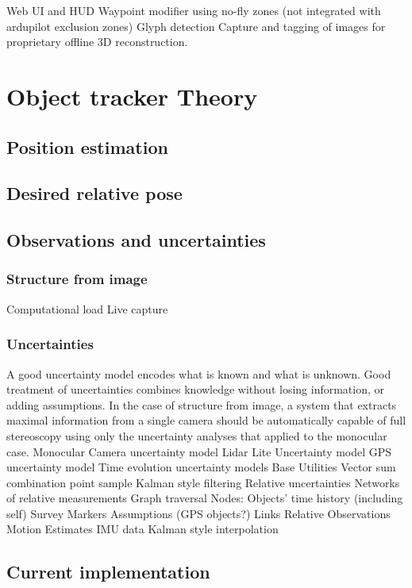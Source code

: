 \documentclass[a4paper, 11pt, titlepage]{article}
\begin{document}
		Web UI and HUD
		Waypoint modifier using no-fly zones (not integrated with ardupilot exclusion zones)
		Glyph detection
		Capture and tagging of images for proprietary offline 3D reconstruction.

\section{Object tracker Theory}
	\subsection{Position estimation}

	\subsection{Desired relative pose}

	\subsection{Observations and uncertainties}
		\subsubsection{Structure from image}
			Computational load
			Live capture
		\subsubsection{Uncertainties}
			A good uncertainty model encodes what is known and what is unknown.
			Good treatment of uncertainties combines knowledge without losing information, or adding assumptions.
			In the case of structure from image, a system that extracts maximal information from a single camera should be automatically capable of full stereoscopy using only the uncertainty analyses that applied to the monocular case.
				Monocular Camera uncertainty model
				Lidar Lite Uncertainty model
				GPS uncertainty model
				Time evolution uncertainty models
				Base Utilities
					Vector sum
					combination
					point sample
				Kalman style filtering
			Relative uncertainties
				Networks of relative measurements
				Graph traversal
					Nodes:
						Objects' time history (including self)
							Survey Markers
						Assumptions (GPS objects?)
					Links
						Relative Observations
						Motion Estimates
							IMU data
							Kalman style interpolation
	\subsection{Current implementation}
\end{document}
